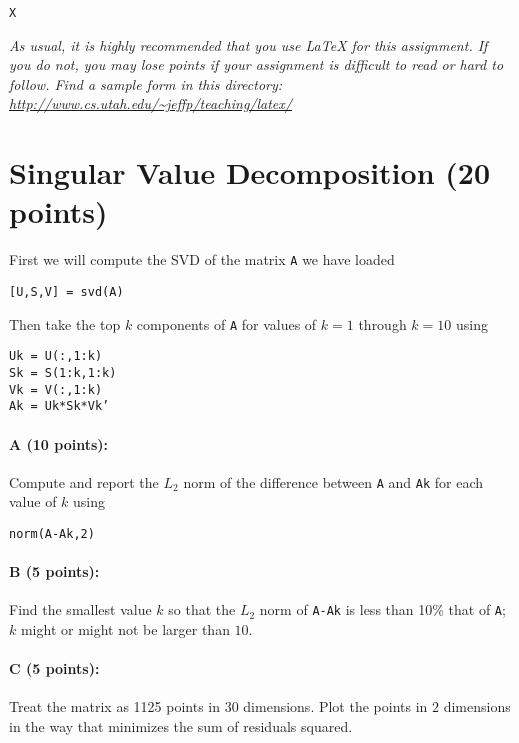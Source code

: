 \documentclass[11pt]{article}
\begin{document}
\texttt{X}

\vspace{.1in}

\emph{As usual, it is highly recommended that you use LaTeX for this assignment.  If you do not, you may lose points if your assignment is difficult to read or hard to follow.  Find a sample form in this directory:
\url{http://www.cs.utah.edu/~jeffp/teaching/latex/}}


\section{Singular Value Decomposition (20 points)}

First we will compute the SVD of the matrix \texttt{A} we have loaded

\noindent
\texttt{[U,S,V] = svd(A)}

Then take the top $k$ components of \texttt{A} for values of $k = 1$ through $k=10$ using

\noindent
\texttt{Uk = U(:,1:k)}
\\ \noindent
\texttt{Sk = S(1:k,1:k)}
\\ \noindent
\texttt{Vk = V(:,1:k)}
\\ \noindent
\texttt{Ak = Uk*Sk*Vk'}

\paragraph{A (10 points):}
Compute and report the $L_2$ norm of the difference between \texttt{A} and \texttt{Ak} for each value of $k$ using

\noindent
\texttt{norm(A-Ak,2)}

\paragraph{B (5 points):}
Find the smallest value $k$ so that the $L_2$ norm of \texttt{A-Ak} is less than 10\% that of \texttt{A}; $k$ might or might not be larger than $10$.  

\paragraph{C (5 points):}
Treat the matrix as 1125 points in 30 dimensions.  Plot the points in $2$ dimensions in the way that minimizes the sum of residuals squared.  
\end{document}
